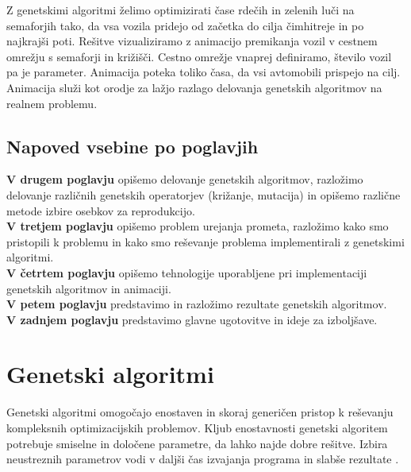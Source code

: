 \documentclass[a4paper, 12pt]{book}
\begin{document}
Z genetskimi algoritmi \v zelimo optimizirati \v case rde\v cih in zelenih lu\v ci na semaforjih tako, da vsa vozila pridejo od za\v cetka do cilja \v cimhitreje in po najkraj\v si poti. Re\v sitve vizualiziramo z animacijo premikanja vozil v cestnem omre\v zju s semaforji in kri\v zi\v s\v ci. Cestno omre\v zje vnaprej definiramo, \v stevilo vozil pa je parameter. Animacija poteka toliko \v casa, da vsi avtomobili prispejo na cilj. Animacija slu\v zi kot orodje za la\v zjo razlago delovanja genetskih algoritmov na realnem problemu.

\section{Napoved vsebine po poglavjih}
\textbf{V drugem poglavju} opi\v semo delovanje genetskih algoritmov, razlo\v zimo delovanje razli\v cnih genetskih operatorjev (kri\v zanje, mutacija) in opi\v semo razli\v cne metode izbire osebkov za reprodukcijo.\\
\textbf{V tretjem poglavju} opi\v semo problem urejanja prometa, razlo\v zimo kako smo pristopili k problemu in kako smo re\v sevanje problema implementirali z genetskimi algoritmi.\\
\textbf{V \v cetrtem poglavju} opi\v semo tehnologije uporabljene pri implementaciji genetskih algoritmov in animaciji.\\
\textbf{V petem poglavju} predstavimo in razlo\v zimo rezultate genetskih algoritmov.\\
\textbf{V zadnjem poglavju} predstavimo glavne ugotovitve in ideje za izbolj\v save.

\chapter{Genetski algoritmi}
\label{ch1}
Genetski algoritmi omogo\v cajo enostaven in skoraj generi\v cen pristop k re\v sevanju kompleksnih optimizacijskih problemov. Kljub enostavnosti genetski algoritem potrebuje smiselne in dolo\v cene parametre, da lahko najde dobre re\v sitve. Izbira neustreznih parametrov vodi v dalj\v si \v cas izvajanja programa in slab\v se rezultate
\cite{sarmady}.
\end{document}

